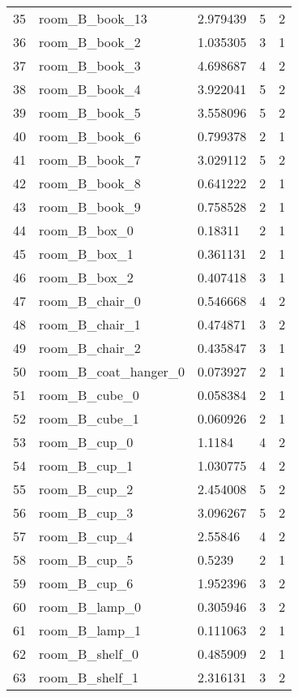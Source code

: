 \begin{longtable}{@{\zz\extracolsep{\fill}} l|llll}
35 & room\_B\_book\_13        & 2.979439 & 5 & 2 \\
36 & room\_B\_book\_2         & 1.035305 & 3 & 1 \\
37 & room\_B\_book\_3         & 4.698687 & 4 & 2 \\
38 & room\_B\_book\_4         & 3.922041 & 5 & 2 \\
39 & room\_B\_book\_5         & 3.558096 & 5 & 2 \\
40 & room\_B\_book\_6         & 0.799378 & 2 & 1 \\
41 & room\_B\_book\_7         & 3.029112 & 5 & 2 \\
42 & room\_B\_book\_8         & 0.641222 & 2 & 1 \\
43 & room\_B\_book\_9         & 0.758528 & 2 & 1 \\
44 & room\_B\_box\_0          & 0.18311  & 2 & 1 \\
45 & room\_B\_box\_1          & 0.361131 & 2 & 1 \\
46 & room\_B\_box\_2          & 0.407418 & 3 & 1 \\
47 & room\_B\_chair\_0        & 0.546668 & 4 & 2 \\
48 & room\_B\_chair\_1        & 0.474871 & 3 & 2 \\
49 & room\_B\_chair\_2        & 0.435847 & 3 & 1 \\
50 & room\_B\_coat\_hanger\_0 & 0.073927 & 2 & 1 \\
51 & room\_B\_cube\_0         & 0.058384 & 2 & 1 \\
52 & room\_B\_cube\_1         & 0.060926 & 2 & 1 \\
53 & room\_B\_cup\_0          & 1.1184   & 4 & 2 \\
54 & room\_B\_cup\_1          & 1.030775 & 4 & 2 \\
55 & room\_B\_cup\_2          & 2.454008 & 5 & 2 \\
56 & room\_B\_cup\_3          & 3.096267 & 5 & 2 \\
57 & room\_B\_cup\_4          & 2.55846  & 4 & 2 \\
58 & room\_B\_cup\_5          & 0.5239   & 2 & 1 \\
59 & room\_B\_cup\_6          & 1.952396 & 3 & 2 \\
60 & room\_B\_lamp\_0         & 0.305946 & 3 & 2 \\
61 & room\_B\_lamp\_1         & 0.111063 & 2 & 1 \\
62 & room\_B\_shelf\_0        & 0.485909 & 2 & 1 \\
63 & room\_B\_shelf\_1        & 2.316131 & 3 & 2 \\

\end{longtable}

